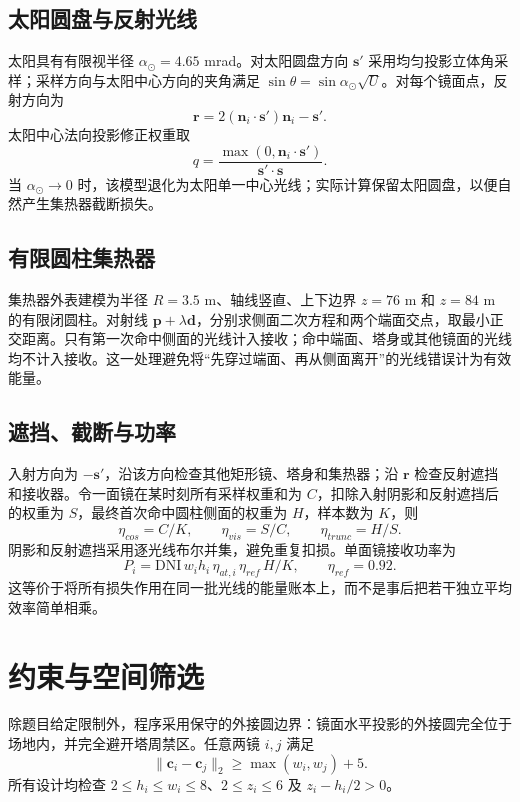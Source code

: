 \documentclass[UTF8,a4paper,11pt]{ctexart}
\newcommand{\vect}[1]{\bm{#1}}
\begin{document}
\subsection{太阳圆盘与反射光线}
太阳具有有限视半径 $\alpha_\odot=4.65$ mrad。对太阳圆盘方向 $\vect s'$ 采用均匀投影立体角采样；采样方向与太阳中心方向的夹角满足 $\sin\theta=\sin\alpha_\odot\sqrt U$。对每个镜面点，反射方向为
\begin{equation}
 \vect r=2(\vect n_i\cdot\vect s')\vect n_i-\vect s'.
 \end{equation}
太阳中心法向投影修正权重取
\begin{equation}
 q=\frac{\max(0,\vect n_i\cdot\vect s')}{\vect s'\cdot\vect s}.
 \label{eq:weight}
\end{equation}
当 $\alpha_\odot\to0$ 时，该模型退化为太阳单一中心光线；实际计算保留太阳圆盘，以便自然产生集热器截断损失。

\subsection{有限圆柱集热器}
集热器外表建模为半径 $R=3.5$ m、轴线竖直、上下边界 $z=76$ m 和 $z=84$ m 的有限闭圆柱。对射线 $\vect p+\lambda\vect d$，分别求侧面二次方程和两个端面交点，取最小正交距离。只有第一次命中侧面的光线计入接收；命中端面、塔身或其他镜面的光线均不计入接收。这一处理避免将“先穿过端面、再从侧面离开”的光线错误计为有效能量。

\subsection{遮挡、截断与功率}
入射方向为 $-\vect s'$，沿该方向检查其他矩形镜、塔身和集热器；沿 $\vect r$ 检查反射遮挡和接收器。令一面镜在某时刻所有采样权重和为 $C$，扣除入射阴影和反射遮挡后的权重为 $S$，最终首次命中圆柱侧面的权重为 $H$，样本数为 $K$，则
\begin{equation}
 \eta_{cos}=C/K,\qquad \eta_{vis}=S/C,\qquad \eta_{trunc}=H/S.
 \label{eq:efficiency}
\end{equation}
阴影和反射遮挡采用逐光线布尔并集，避免重复扣损。单面镜接收功率为
\begin{equation}
 P_i=\mathrm{DNI}\,w_i h_i\,\eta_{at,i}\,\eta_{ref}\,H/K,
 \qquad \eta_{ref}=0.92.
 \label{eq:power}
\end{equation}
这等价于将所有损失作用在同一批光线的能量账本上，而不是事后把若干独立平均效率简单相乘。

\section{约束与空间筛选}
除题目给定限制外，程序采用保守的外接圆边界：镜面水平投影的外接圆完全位于场地内，并完全避开塔周禁区。任意两镜 $i,j$ 满足
\begin{equation}
 \|\vect c_i-\vect c_j\|_2\ge \max(w_i,w_j)+5.
\end{equation}
所有设计均检查 $2\le h_i\le w_i\le8$、$2\le z_i\le6$ 及 $z_i-h_i/2>0$。
\end{document}
